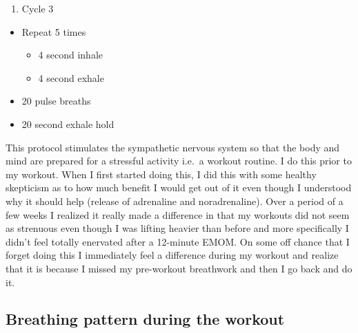 \documentclass[
  oneside]{book}
\providecommand{\tightlist}{%
  \setlength{\itemsep}{0pt}\setlength{\parskip}{0pt}}
\begin{document}
\begin{enumerate}
\def\labelenumi{\arabic{enumi}.}
\setcounter{enumi}{2}
\tightlist
\item
  Cycle 3
\end{enumerate}

\begin{itemize}
\tightlist
\item
  Repeat 5 times

  \begin{itemize}
  \tightlist
  \item
    4 second inhale
  \item
    4 second exhale
  \end{itemize}
\item
  20 pulse breaths
\item
  20 second exhale hold
\end{itemize}

This protocol stimulates the sympathetic nervous system so that the body and mind are prepared for a stressful activity i.e.~a workout routine. I do this prior to my workout. When I first started doing this, I did this with some healthy skepticism as to how much benefit I would get out of it even though I understood why it should help (release of adrenaline and noradrenaline). Over a period of a few weeks I realized it really made a difference in that my workouts did not seem as strenuous even though I was lifting heavier than before and more specifically I didn't feel totally enervated after a 12-minute EMOM. On some off chance that I forget doing this I immediately feel a difference during my workout and realize that it is because I missed my pre-workout breathwork and then I go back and do it.

\hypertarget{breathing-pattern-during-the-workout}{%
\subsection{Breathing pattern during the workout}\label{breathing-pattern-during-the-workout}}
\end{document}

